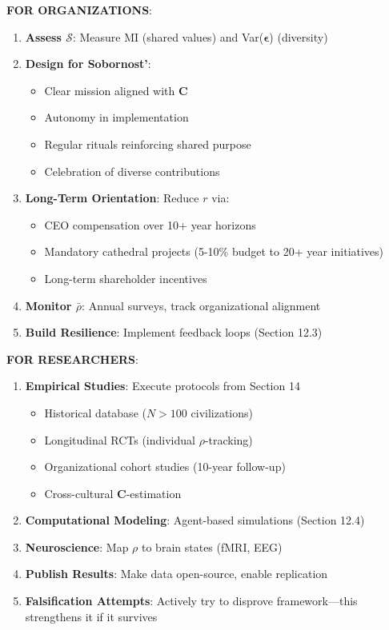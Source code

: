 \documentclass[11pt,a4paper]{article}
\theoremstyle{definition}
\theoremstyle{remark}
\begin{document}
\begin{small}
\begin{enumerate}
\begin{protocol}
\begin{mdframed}[backgroundcolor=green!10,linewidth=2pt]
\textbf{FOR ORGANIZATIONS}:
\begin{enumerate}
    \item \textbf{Assess \(\mathcal{S}\)}: Measure MI (shared values) and Var(\(\boldsymbol{\epsilon}\)) (diversity)
    \item \textbf{Design for Sobornost'}:
        \begin{itemize}[nosep]
            \item Clear mission aligned with \(\mathbf{C}\)
            \item Autonomy in implementation
            \item Regular rituals reinforcing shared purpose
            \item Celebration of diverse contributions
        \end{itemize}
    \item \textbf{Long-Term Orientation}: Reduce \(r\) via:
        \begin{itemize}[nosep]
            \item CEO compensation over 10+ year horizons
            \item Mandatory cathedral projects (5-10\% budget to 20+ year initiatives)
            \item Long-term shareholder incentives
        \end{itemize}
    \item \textbf{Monitor \(\bar{\rho}\)}: Annual surveys, track organizational alignment
    \item \textbf{Build Resilience}: Implement feedback loops (Section 12.3)
\end{enumerate}

\textbf{FOR RESEARCHERS}:
\begin{enumerate}
    \item \textbf{Empirical Studies}: Execute protocols from Section 14
        \begin{itemize}[nosep]
            \item Historical database (\(N > 100\) civilizations)
            \item Longitudinal RCTs (individual \(\rho\)-tracking)
            \item Organizational cohort studies (10-year follow-up)
            \item Cross-cultural \(\mathbf{C}\)-estimation
        \end{itemize}
    \item \textbf{Computational Modeling}: Agent-based simulations (Section 12.4)
    \item \textbf{Neuroscience}: Map \(\rho\) to brain states (fMRI, EEG)
    \item \textbf{Publish Results}: Make data open-source, enable replication
    \item \textbf{Falsification Attempts}: Actively try to disprove framework—this strengthens it if it survives
\end{enumerate}


\end{mdframed}
\end{protocol}
\end{enumerate}
\end{small}
\end{document}
